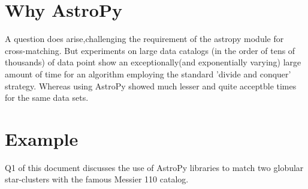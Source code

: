 \documentclass{article}
\begin{document}
\section{Why AstroPy}
A question does arise,challenging the requirement of the astropy module for cross-matching.
But experiments on large data catalogs (in the order of tens of thousands) of data point show an exceptionally(and exponentially varying) large amount of time for an algorithm employing the standard 'divide and conquer' strategy.
Whereas using AstroPy showed much lesser and quite acceptble times for the same data sets.
\section{Example}
Q1 of this document discusses the use of AstroPy libraries to match two globular star-clusters with the famous Messier 110 catalog.
\end{document}
